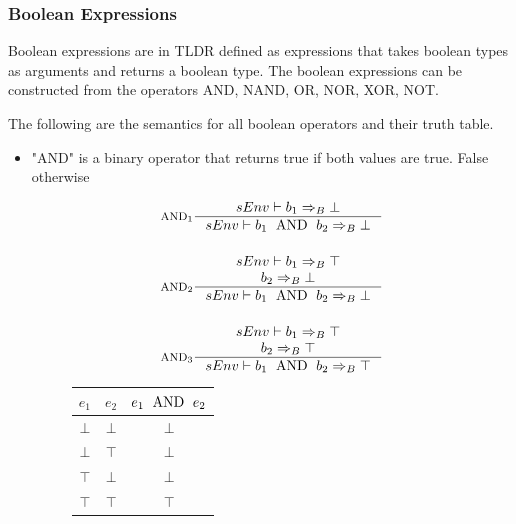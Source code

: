 \subsubsection{Boolean Expressions}
Boolean expressions are in TLDR defined as expressions that takes boolean types as arguments and returns a boolean type. The boolean expressions can be constructed from the operators AND, NAND, OR, NOR, XOR, NOT.

The following are the semantics for all boolean operators and their truth table.

\begin{itemize}
\item "AND" is a binary operator that returns true if both values are true. False otherwise
\begin{figure}[H]
\centering
  \begin{minipage}[c]{0.45\linewidth}
	  \centering
    \begin{align*}
    &\inference[$\text{AND}_1$]{sEnv \vdash b_1 \Rightarrow_B \bot}
                               {sEnv \vdash b_1 \Tand b_2 \Rightarrow_B \bot}
    \\\\
    &\inference[$\text{AND}_2$]{sEnv \vdash b_1 \Rightarrow_B \top \\ b_2 \Rightarrow_B \bot}
                               {sEnv \vdash b_1 \Tand b_2 \Rightarrow_B \bot}
    \\\\
    &\inference[$\text{AND}_3$]{sEnv \vdash b_1 \Rightarrow_B \top \\ b_2 \Rightarrow_B \top}
                               {sEnv \vdash b_1 \Tand b_2 \Rightarrow_B \top}
    \end{align*}
  \end{minipage}
	\quad
	\begin{minipage}[c]{0.45\linewidth}
	  \centering
    \begin{tabular}{ | c | c | c | }
      \hline
      $e_1$ & $e_2$ & $e_1 \text{\; AND \;} e_2$ \\\hline
      $\bot$ & $\bot$ & $\bot$ \\\hline
      $\bot$ & $\top$ & $\bot$ \\\hline
      $\top$ & $\bot$ & $\bot$ \\\hline
      $\top$ & $\top$ & $\top$ \\\hline
    \end{tabular}
  \end{minipage}
\end{figure}


\end{itemize}
